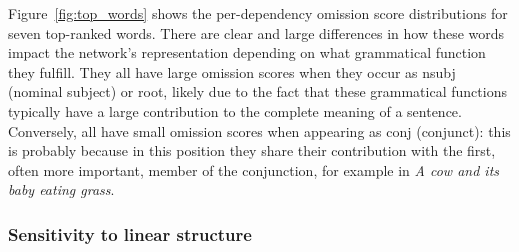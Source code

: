 Figure~\ref{fig:top_words} shows the per-dependency 
omission score distributions for seven top-ranked words.
There are clear and large differences in how these words
impact the network's representation depending on what grammatical
function they fulfill. They all have large omission scores when they
occur as {\sc nsubj} (nominal subject) or {\sc root}, likely due to the fact that these
grammatical functions typically have a large contribution to the
complete meaning of a sentence.  Conversely, all have small omission 
scores when appearing as {\sc conj} (conjunct): this is probably because in this position
they share their contribution with the first, often more important,
member of the conjunction, for example in {\it A cow and its baby eating
  grass}. 

\subsubsection{Sensitivity to linear structure}
\label{subsec:information-struct}

